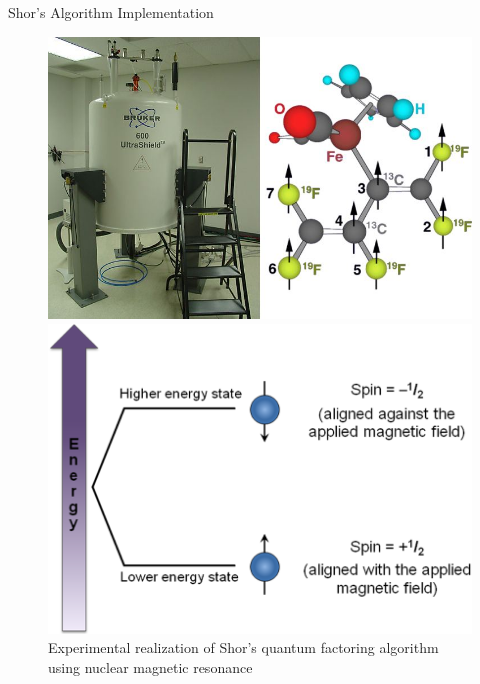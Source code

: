 \documentclass{beamer}
\begin{document}
\begin{frame}{Shor's Algorithm Implementation}
  
\begin{figure}[ht]
    \begin{minipage}{0.15\linewidth}
       \includegraphics[scale=.2]{pasted10}
    \end{minipage}
    \qquad\qquad\qquad\qquad\qquad
    \begin{minipage}{0.2\linewidth}
       \includegraphics[scale=.3]{pasted11}
    \end{minipage}
\caption{Experimental realization of Shor's quantum factoring algorithm using nuclear magnetic resonance \cite{2001Natur.414..883V} }
\end{figure}
\end{frame}
\end{document}
